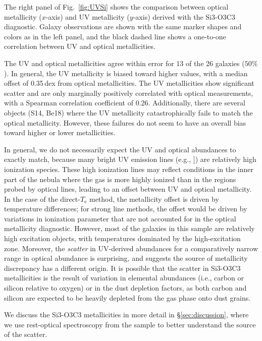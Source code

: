 \documentclass[trackchanges, preprint2]{aastex62}
\newcommand{\ciii}{\ion{C}{3}]}
\newcommand{\Te}{\ensuremath{T_{\mathrm{e}}}\xspace}
\begin{document}
The right panel of Fig.~\ref{fig:UVSi} shows the comparison between optical metallicity ($x$-axis) and UV metallicity ($y$-axis) derived with the Si3-O3C3 diagnostic. Galaxy observations are shown with the same marker shapes and colors as in the left panel, and the black dashed line shows a one-to-one correlation between UV and optical metallicities.

The UV and optical metallicities agree within error for 13 of the 26 galaxies ($50\%$). In general, the UV metallicity is biased toward higher values, with a median offset of 0.35\,dex from optical metallicities. The UV metallicities show significant scatter and are only marginally positively correlated with optical measurements, with a Spearman correlation coefficient of 0.26. Additionally, there are several objects (S14, Be18) where the UV metallicity catastrophically fails to match the optical metallicity. However, these failures do not seem to have an overall bias toward higher or lower metallicities.

In general, we do not necessarily expect the UV and optical abundances to exactly match, because many bright UV emission lines (e.g., \ciii) are relatively high ionization species. These high ionization lines may reflect conditions in the inner part of the nebula where the gas is more highly ionized than in the regions probed by optical lines, leading to an offset between UV and optical metallicity. In the case of the direct-\Te{} method, the metallicity offset is driven by temperature differences; for strong line methods, the offset would be driven by variations in ionization parameter that are not accounted for in the optical metallicity diagnostic. However, most of the galaxies in this sample are relatively high excitation objects, with temperatures dominated by the high-excitation zone. Moreover, the \emph{scatter} in UV-derived abundances for a comparatively narrow range in optical abundance is surprising, and suggests the source of metallicity discrepancy has a different origin. It is possible that the scatter in Si3-O3C3 metallicities is the result of variation in elemental abundances (i.e., carbon or silicon relative to oxygen) or in the dust depletion factors, as both carbon and silicon are expected to be heavily depleted from the gas phase onto dust grains.

We discuss the Si3-O3C3 metallicities in more detail in \S\ref{sec:discussion}, where we use rest-optical spectroscopy from the \citet{Berg+2016} sample to better understand the source of the scatter.
\end{document}
